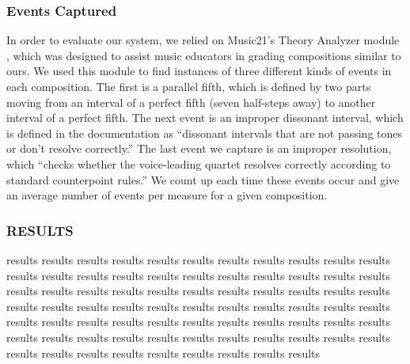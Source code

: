 \documentclass{sig-alternate}
\begin{document}
\subsubsection{Events Captured}
In order to evaluate our system, we relied on Music21's Theory Analyzer module \cite{Cuthbert_music21:a}, which was designed to assist music educators in grading compositions similar to ours. We used this module to find instances of three different kinds of events in each composition. The first is a parallel fifth, which is defined by two parts moving from an interval of a perfect fifth (seven half-steps away) to another interval of a perfect fifth. The next event is an improper dissonant interval, which is defined in the documentation as ``dissonant intervals that are not passing tones or don't resolve correctly.'' The last event we capture is an improper resolution, which ``checks whether the voice-leading quartet resolves correctly according to standard counterpoint rules.'' We count up each time these events occur and give an average number of events per measure for a given composition. 

\subsubsection{RESULTS}

results results results results results results results results results results results results results results results results results results results results results results results results results results results results results results results results results results results results results results results results results results results results results results results results results results results results results results results results results results results results results results results results results results results results results results results results results results results 
\end{document}
